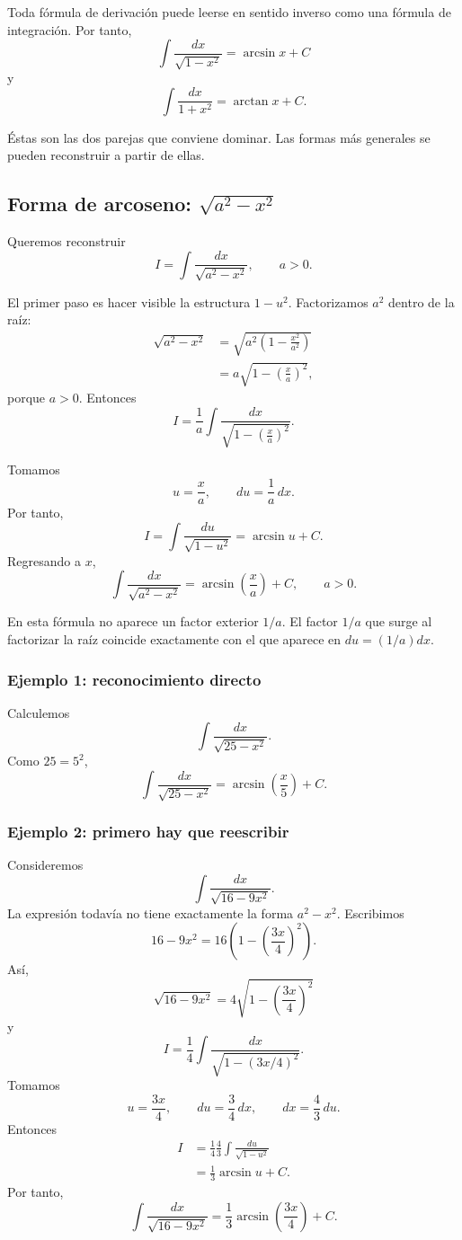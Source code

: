 Toda fórmula de derivación puede leerse en sentido inverso como una fórmula
de integración. Por tanto,
\[
\boxed{\int\frac{dx}{\sqrt{1-x^2}}=\arcsin x+C}
\]
y
\[
\boxed{\int\frac{dx}{1+x^2}=\arctan x+C.}
\]

Éstas son las dos parejas que conviene dominar. Las formas más generales se
pueden reconstruir a partir de ellas.

\subsection{Forma de arcoseno: \texorpdfstring{$\sqrt{a^2-x^2}$}{sqrt(a2-x2)}}

Queremos reconstruir
\[
I=\int\frac{dx}{\sqrt{a^2-x^2}},\qquad a>0.
\]

El primer paso es hacer visible la estructura $1-u^2$. Factorizamos $a^2$
dentro de la raíz:
\begin{align*}
\sqrt{a^2-x^2}
&=\sqrt{a^2\left(1-\frac{x^2}{a^2}\right)}\\
&=a\sqrt{1-\left(\frac{x}{a}\right)^2},
\end{align*}
porque $a>0$. Entonces
\[
I=\frac1a\int
\frac{dx}{\sqrt{1-\left(\frac{x}{a}\right)^2}}.
\]

Tomamos
\[
u=\frac{x}{a},\qquad du=\frac1a\,dx.
\]
Por tanto,
\[
I=\int\frac{du}{\sqrt{1-u^2}}
=\arcsin u+C.
\]
Regresando a $x$,
\[
\boxed{\int\frac{dx}{\sqrt{a^2-x^2}}
=\arcsin\left(\frac{x}{a}\right)+C,\qquad a>0.}
\]

\begin{observacion}
En esta fórmula no aparece un factor exterior $1/a$. El factor $1/a$ que
surge al factorizar la raíz coincide exactamente con el que aparece en
$du=(1/a)dx$.
\end{observacion}

\subsubsection*{Ejemplo 1: reconocimiento directo}
Calculemos
\[
\int\frac{dx}{\sqrt{25-x^2}}.
\]
Como $25=5^2$,
\[
\int\frac{dx}{\sqrt{25-x^2}}
=\boxed{\arcsin\left(\frac{x}{5}\right)+C}.
\]

\subsubsection*{Ejemplo 2: primero hay que reescribir}
Consideremos
\[
\int\frac{dx}{\sqrt{16-9x^2}}.
\]
La expresión todavía no tiene exactamente la forma $a^2-x^2$. Escribimos
\[
16-9x^2=16\left(1-\left(\frac{3x}{4}\right)^2\right).
\]
Así,
\[
\sqrt{16-9x^2}=4\sqrt{1-\left(\frac{3x}{4}\right)^2}
\]
y
\[
I=\frac14\int\frac{dx}{\sqrt{1-(3x/4)^2}}.
\]
Tomamos
\[
u=\frac{3x}{4},\qquad du=\frac34\,dx,
\qquad dx=\frac43\,du.
\]
Entonces
\begin{align*}
I
&=\frac14\frac43\int\frac{du}{\sqrt{1-u^2}}\\
&=\frac13\arcsin u+C.
\end{align*}
Por tanto,
\[
\boxed{\int\frac{dx}{\sqrt{16-9x^2}}
=\frac13\arcsin\left(\frac{3x}{4}\right)+C.}
\]


